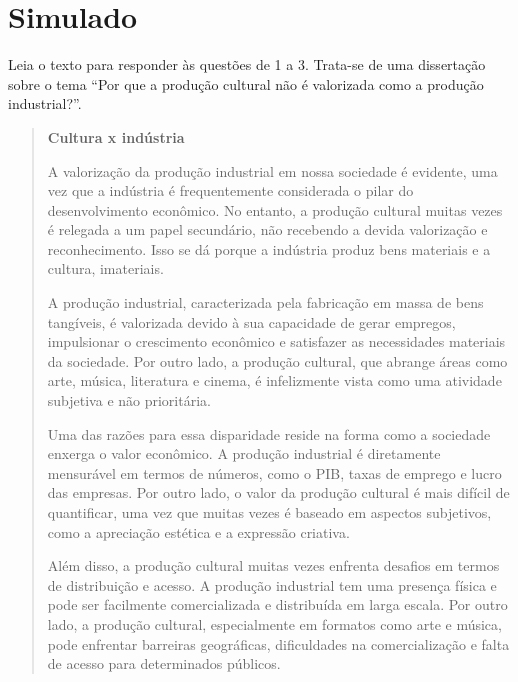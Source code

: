 \chapter[Simulado 4]{Simulado}

\vspace{-.5cm}
\enlargethispage{\baselineskip}

Leia o texto para responder às questões de 1 a 3. Trata-se de uma
dissertação sobre o tema ``Por que a produção cultural não é valorizada
como a produção industrial?''.

\begin{quote}
\textbf{Cultura x indústria}


A valorização da produção industrial em nossa sociedade é evidente, uma
vez que a indústria é frequentemente considerada o pilar do
desenvolvimento econômico. No entanto, a produção cultural muitas vezes
é relegada a um papel secundário, não recebendo a devida valorização e
reconhecimento. Isso se dá porque a indústria produz bens materiais e a
cultura, imateriais.

A produção industrial, caracterizada pela fabricação em massa de bens
tangíveis, é valorizada devido à sua capacidade de gerar empregos,
impulsionar o crescimento econômico e satisfazer as necessidades
materiais da sociedade. Por outro lado, a produção cultural, que abrange
áreas como arte, música, literatura e cinema, é infelizmente vista como
uma atividade subjetiva e não prioritária.

Uma das razões para essa disparidade reside na forma como a sociedade
enxerga o valor econômico. A produção industrial é diretamente
mensurável em termos de números, como o PIB, taxas de emprego e lucro
das empresas. Por outro lado, o valor da produção cultural é mais
difícil de quantificar, uma vez que muitas vezes é baseado em aspectos
subjetivos, como a apreciação estética e a expressão criativa.

Além disso, a produção cultural muitas vezes enfrenta desafios em termos
de distribuição e acesso. A produção industrial tem uma presença física
e pode ser facilmente comercializada e distribuída em larga escala. Por
outro lado, a produção cultural, especialmente em formatos como arte e
música, pode enfrentar barreiras geográficas, dificuldades na
comercialização e falta de acesso para determinados públicos.


\end{quote}
